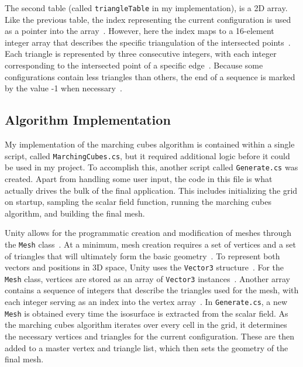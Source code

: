 \documentclass[pageno]{jpaper}
\begin{document}
The second table (called \texttt{triangleTable} in my implementation), is a 2D array. Like the previous table, the index representing the current configuration is used as a pointer into the array~\cite{bourke}. However, here the index maps to a 16-element integer array that describes the specific triangulation of the intersected points~\cite{bloyd,bourke}. Each triangle is represented by three consecutive integers, with each integer corresponding to the intersected point of a specific edge~\cite{bloyd}. Because some configurations contain less triangles than others, the end of a sequence is marked by the value -1 when necessary~\cite{bloyd}.

\subsection{Algorithm Implementation}

My implementation of the marching cubes algorithm is contained within a single script, called \texttt{MarchingCubes.cs}, but it required additional logic before it could be used in my project. To accomplish this, another script called \texttt{Generate.cs} was created. Apart from handling some user input, the code in this file is what actually drives the bulk of the final application. This includes initializing the grid on startup, sampling the scalar field function, running the marching cubes algorithm, and building the final mesh.

Unity allows for the programmatic creation and modification of meshes through the \texttt{Mesh} class~\cite{unitymesh}. At a minimum, mesh creation requires a set of vertices and a set of triangles that will ultimately form the basic geometry~\cite{unitymesh}. To represent both vectors and positions in 3D space, Unity uses the \texttt{Vector3} structure~\cite{unityvector}. For the \texttt{Mesh} class, vertices are stored as an array of \texttt{Vector3} instances~\cite{unitymesh}. Another array contains a sequence of integers that describe the triangles used for the mesh, with each integer serving as an index into the vertex array~\cite{unitymesh}. In \texttt{Generate.cs}, a new \texttt{Mesh} is obtained every time the isosurface is extracted from the scalar field. As the marching cubes algorithm iterates over every cell in the grid, it determines the necessary vertices and triangles for the current configuration. These are then added to a master vertex and triangle list, which then sets the geometry of the final mesh.
\end{document}
